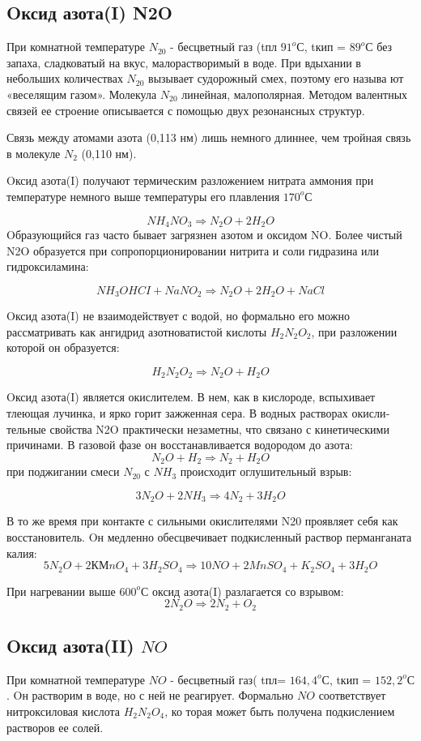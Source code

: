 \documentclass[11pt]{article}
\begin{document}
  \subsection{Oксид азота(I) N2O} При комнатной температуре $N_20$ - бесцветный газ (tпл $91 ^oС$, tкип = $89^o С$ без запаха, сладковатый на вкус, малорастворимый в воде. При вдыхании в небольших количествах $N_20$ вызывает судорожный смех, поэтому его называ ют «веселящим газом». Молекула $N_20$ линейная, малополярная. Методом валентных связей ее строение описывается с помощью двух резонансных структур.

Связь между атомами азота (0,113 нм) лишь немного длиннее, чем тройная связь в молекуле $N_2$ (0,110 нм). 

Oксид азота(I) получают термическим разложением нитрата аммония при температуре немного выше температуры его плавления $170^oС$ 

$$NH _4 NO _3 \Rightarrow N _2 O + 2H_2 O$$
Oбразующийся газ часто бывает загрязнен азотом и оксидом NO. Более чистый N2O образуется при сопропорционировании нитрита и соли гидразина или гидроксиламина: 

$$NH _3 OHCI + NaNO _2 \Rightarrow N _2 O + 2H _2 O + NaCl$$
 
Oксид азота(I) не взаимодействует с водой, но формально его можно рассматривать как ангидрид азотноватистой кислоты $H_2N_2O_2$, при разложении которой он образуется: 

$$H _2 N _2 O _2 \Rightarrow N _2 O + H _2 O$$

Oксид азота(I) является окислителем. В нем, как в кислороде, вспыхивает тлеющая лучинка, и ярко горит зажженная сера. В водных растворах окисли‐ тельные свойства N2O практически незаметны, что связано с кинетическими причинами. В газовой фазе он восстанавливается водородом до азота: 
$$N _2 O + H _2 \Rightarrow N _2 + H _2 O$$
при поджигании смеси $N_20$ с $NH_3$ происходит оглушительный взрыв: 

$$3N _2 O + 2NH _3 \Rightarrow 4N _2 + 3H _2O$$

В то же время при контакте с сильными окислителями N20 проявляет себя как восстановитель. Oн медленно обесцвечивает подкисленный раствор перманганата калия: 
$$5N _2 O + 2КМnO _4 + 3H _2 SO _4 \Rightarrow 10NO + 2MnSO _4 + K _2 SO _4 + 3H _2 O$$

При нагревании выше $600^oС$ оксид азота(I) разлагается со взрывом: 
$$2N _2 O \Rightarrow 2N _2 + O _2 $$

\subsection{Oксид азота(II) $NO$} При комнатной температуре $NO$ - бесцветный газ( tпл= $164,4 ^oС$, tкип = $152,2 ^oС$ . Oн растворим в воде, но с ней не реагирует. Формально $NO$ соответствует нитроксиловая кислота $H_2N_2O_4$, ко торая может быть получена подкислением растворов ее солей. 
\end{document}
